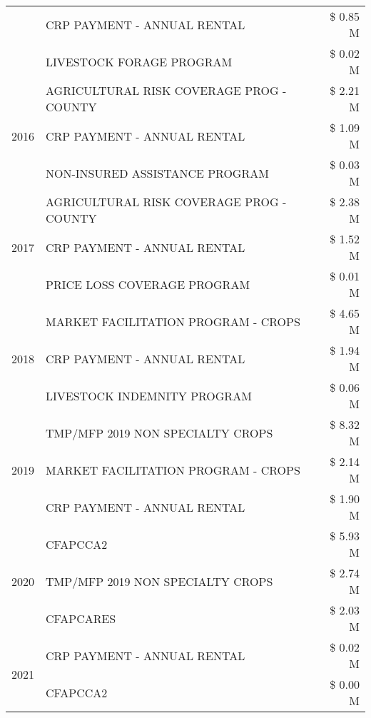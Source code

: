 \begin{tabular}{llr}
 & CRP PAYMENT - ANNUAL RENTAL & \$ 0.85 M \\
 & LIVESTOCK FORAGE PROGRAM & \$ 0.02 M \\
\cline{1-3}
\multirow[t]{3}{*}{2016} & AGRICULTURAL RISK COVERAGE PROG - COUNTY & \$ 2.21 M \\
 & CRP PAYMENT - ANNUAL RENTAL & \$ 1.09 M \\
 & NON-INSURED ASSISTANCE PROGRAM & \$ 0.03 M \\
\cline{1-3}
\multirow[t]{3}{*}{2017} & AGRICULTURAL RISK COVERAGE PROG - COUNTY & \$ 2.38 M \\
 & CRP PAYMENT - ANNUAL RENTAL & \$ 1.52 M \\
 & PRICE LOSS COVERAGE PROGRAM & \$ 0.01 M \\
\cline{1-3}
\multirow[t]{3}{*}{2018} & MARKET FACILITATION PROGRAM - CROPS & \$ 4.65 M \\
 & CRP PAYMENT - ANNUAL RENTAL & \$ 1.94 M \\
 & LIVESTOCK INDEMNITY PROGRAM & \$ 0.06 M \\
\cline{1-3}
\multirow[t]{3}{*}{2019} & TMP/MFP 2019 NON SPECIALTY CROPS & \$ 8.32 M \\
 & MARKET FACILITATION PROGRAM - CROPS & \$ 2.14 M \\
 & CRP PAYMENT - ANNUAL RENTAL & \$ 1.90 M \\
\cline{1-3}
\multirow[t]{3}{*}{2020} & CFAPCCA2 & \$ 5.93 M \\
 & TMP/MFP 2019 NON SPECIALTY CROPS & \$ 2.74 M \\
 & CFAPCARES & \$ 2.03 M \\
\cline{1-3}
\multirow[t]{2}{*}{2021} & CRP PAYMENT - ANNUAL RENTAL & \$ 0.02 M \\
 & CFAPCCA2 & \$ 0.00 M \\
\cline{1-3}
\bottomrule
\end{tabular}
